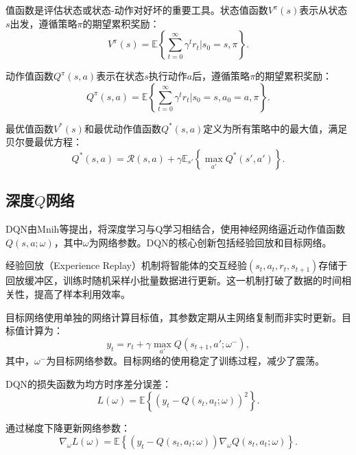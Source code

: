 值函数是评估状态或状态-动作对好坏的重要工具。状态值函数$V^{\pi}(s)$表示从状态$s$出发，遵循策略$\pi$的期望累积奖励：
\begin{equation}
V^{\pi}(s) = \mathbb{E}\left\{\sum_{t=0}^{\infty}\gamma^t r_t \Big| s_0 = s, \pi\right\}.
\end{equation}

动作值函数$Q^{\pi}(s, a)$表示在状态$s$执行动作$a$后，遵循策略$\pi$的期望累积奖励：
\begin{equation}
Q^{\pi}(s, a) = \mathbb{E}\left\{\sum_{t=0}^{\infty}\gamma^t r_t \Big| s_0 = s, a_0 = a, \pi\right\}.
\end{equation}

最优值函数$V^*(s)$和最优动作值函数$Q^*(s, a)$定义为所有策略中的最大值，满足贝尔曼最优方程\cite{chaptertwo11}：
\begin{equation}
Q^*(s, a) = \mathcal{R}(s, a) + \gamma\mathbb{E}_{s'}\left\{\max_{a'}Q^*(s', a')\right\}.
\end{equation}

\subsection{深度$Q$网络}

DQN由Mnih等\cite{chaptertwo12}提出，将深度学习与Q学习相结合，使用神经网络逼近动作值函数$Q(s, a; \omega)$，其中$\omega$为网络参数。DQN的核心创新包括经验回放和目标网络。

经验回放（Experience Replay）机制将智能体的交互经验$(s_t, a_t, r_t, s_{t+1})$存储于回放缓冲区，训练时随机采样小批量数据进行更新。这一机制打破了数据的时间相关性，提高了样本利用效率\cite{chaptertwo13}。

目标网络使用单独的网络计算目标值，其参数定期从主网络复制而非实时更新。目标值计算为：
\begin{equation}
y_t = r_t + \gamma \max_{a'}Q(s_{t+1}, a'; \omega^-),
\end{equation}
其中，$\omega^-$为目标网络参数。目标网络的使用稳定了训练过程，减少了震荡\cite{chaptertwo12}。

DQN的损失函数为均方时序差分误差：
\begin{equation}
L(\omega) = \mathbb{E}\left\{(y_t - Q(s_t, a_t; \omega))^2\right\}.
\end{equation}

通过梯度下降更新网络参数：
\begin{equation}
\nabla_{\omega}L(\omega) = \mathbb{E}\left\{(y_t - Q(s_t, a_t; \omega))\nabla_{\omega}Q(s_t, a_t; \omega)\right\}.
\end{equation}

